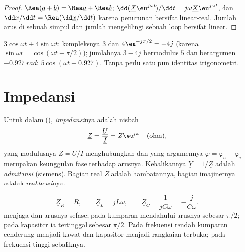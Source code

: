 \begin{proof}
$\Rea(\underline a + \underline b) = \Rea\underline a + \Rea\underline b$;
$\dd(\underline X\eu^{j\omega t})/\dd t = j\omega\underline X\eu^{j\omega t}$,
dan $\dd x/\dd t = \Rea(\dd\underline x/\dd t)$ karena penurunan bersifat
linear-real. Jumlah arus di sebuah simpul dan jumlah 
mengelilingi sebuah loop bersifat linear.
\end{proof}

\begin{example}\label{ex:b1:sinusoidal-impedance:add}
$3\cos\omega t + 4\sin\omega t$:  kompleksnya $3$ dan
$4\eu^{-j\pi/2} = -4j$ (karena $\sin\omega t = \cos(\omega t - \pi/2)$);
jumlahnya $3 - 4j$ bermodulus $5$ dan berargumen $-0.927\ \unit{rad}$:
$5\cos(\omega t - 0.927)$. Tanpa perlu satu pun identitas trigonometri.
\end{example}

\section{Impedansi}

\begin{definition}\label{def:b1:sinusoidal-impedance:impedance}
Untuk  dalam  (), \emph{impedansi}nya adalah nisbah 
\[
\underline Z = \frac{\underline U}{\underline I} = Z\eu^{j\varphi}
\quad (\text{ohm}),
\]
yang modulusnya $Z = U/I$ menghubungkan  dan yang argumennya
$\varphi = \varphi_u - \varphi_i$ merupakan keunggulan fase 
terhadap arusnya. Kebalikannya $\underline Y = 1/\underline Z$ adalah
\emph{admitansi} (siemens). Bagian real $\underline Z$ adalah
hambatannya, bagian imajinernya adalah \emph{reaktansi}nya.
\end{definition}

\begin{proposition}[Impedansi R, L, C]\label{prop:b1:sinusoidal-impedance:rlc}
\[
\underline Z_R = R, \qquad \underline Z_L = jL\omega, \qquad
\underline Z_C = \frac{1}{jC\omega} = -\frac{j}{C\omega} .
\]
 menjaga  dan arusnya sefase; pada kumparan 
mendahului arusnya sebesar $\pi/2$; pada kapasitor ia tertinggal
sebesar $\pi/2$. Pada frekuensi rendah kumparan cenderung menjadi kawat
dan kapasitor menjadi rangkaian terbuka; pada frekuensi tinggi sebaliknya.
\end{proposition}

